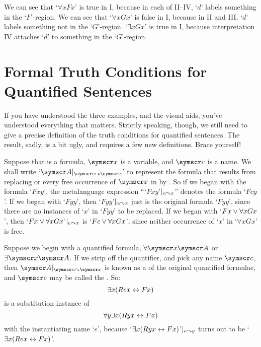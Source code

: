 \begin{earg}
\begin{center}
    \end{center}
We can see that `$\forall x Fx$' is true in I, because in each of II–IV, `$d$' labels something in the `$F$'-region. We can see that `$\forall x Gx$' is false in I, because in II and III, `$d$' labels something not in the `$G$'-region. `$\exists x Gx$' is true in I, because interpretation IV attaches `$d$' to something in the `$G$'-region. 

\section{Formal Truth Conditions for Quantified Sentences}\label{fol.truth.quant}

If you have understood the three examples, and the visual aids, you've understood everything that matters. Strictly speaking, though, we still need to give a precise definition of the truth conditions for quantified sentences. The result, sadly, is a bit ugly, and requires a few new definitions. Brace yourself!

Suppose that  is a formula, $\meta{x}$ is a variable, and $\meta{c}$ is a name. We shall write `$\meta{A}\subs{\meta{c}}{\meta{x}}$' to represent the formula that results from replacing or  every free occurrence of $\meta{x}$ in  by . So if we began with the formula `$Fxy$', the metalanguage expression ``{`$Fxy$'}$\vert_{c\curvearrowright x}$'' denotes the formula `$Fcy$'. If we began with `$Fyy$', then `$Fyy$'$\vert_{c\curvearrowright x}$ just is the original formula `$Fyy$', since there are no instances of `$x$' in `$Fyy$' to be replaced. If we began with `$Fx \vee \forall x Gx$', then `$Fx \vee \forall x Gx$'$\vert_{c\curvearrowright x}$ is `$Fc \vee \forall x Gx$', since neither occurrence of `$x$' in `$\forall x Gx$' is free.

Suppose we begin with a quantified formula, $\forall \meta{x}\meta{A}$ or $\exists \meta{x}\meta{A}$. If we strip off the quantifier, and pick any name $\meta{c}$, then $\meta{A}\subs{\meta{c}}{\meta{x}}$ is known as a   of the original quantified formulae, and $\meta{c}$ may be called the . So:
	$$\exists x (Rex \leftrightarrow Fx)$$
is a substitution instance of 
	$$\forall y \exists x (Ryx \leftrightarrow Fx)$$
with the instantiating name `$e$', because  `$\exists x (Ryx \leftrightarrow Fx)$'$\vert_{e\curvearrowright y}$ turns out to be `$\exists x (Rex \leftrightarrow Fx)$'.


\end{earg}
